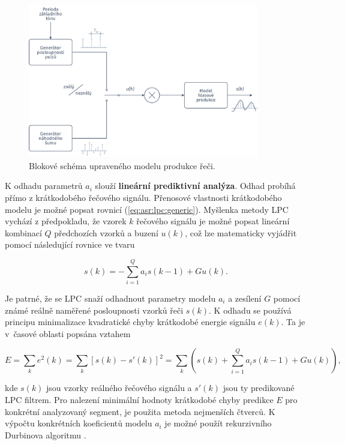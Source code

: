 \begin{figure}[hbpt]
  \centering
  \includegraphics[width=0.9\textwidth]{./ch4-asr/img/speech_process.pdf}
  \caption{Blokové schéma upraveného modelu produkce řeči.}
  \label{fig:asr:model:speech:excitation}
\end{figure}

K odhadu parametrů $a_i$ slouží \textbf{lineární prediktivní analýza}. Odhad probíhá přímo z krátkodobého řečového signálu. Přenosové vlastnosti krátkodobého modelu je možné popsat rovnicí (\ref{eq:asr:lpc:generic}). Myšlenka metody LPC vychází z předpokladu, že vzorek $k$ řečového signálu je možné popsat lineární kombinací $Q$ předchozích vzorků a buzení $u(k)$, což lze matematicky vyjádřit pomocí následující rovnice ve tvaru

\begin{equation}
  s(k) = - \sum_{i = 1}^{Q} a_i s(k-1) + Gu(k).
  \label{eq:asr:lpc:generic:edited}
\end{equation}

\noindent %
Je patrné, že se LPC snaží odhadnout parametry modelu $a_i$ a zesílení $G$ pomocí známé reálně naměřené posloupnosti vzorků řeči $s(k)$. K odhadu se používá principu minimalizace kvadratické chyby krátkodobé energie signálu $e\left(k\right)$. Ta je v~časové oblasti popsána vztahem

\begin{equation}
  E = \sum_{k} e^2(k) = \sum_{k} \left[ s(k) - s'(k)\right]^2 = \sum_{k} \left( s(k) + \sum_{i = 1}^{Q} a_i s(k-1) + Gu(k) \right),
\end{equation}

\noindent kde $s(k)$ jsou vzorky reálného řečového signálu a $s'(k)$ jsou ty predikované LPC filtrem. Pro nalezení minimální hodnoty krátkodobé chyby predikce $E$ pro konkrétní analyzovaný segment, je použita metoda nejmenších čtverců. K výpočtu konkrétních koeficientů modelu $a_i$ je možné použít rekurzivního Durbinova algoritmu \cite{Holmes2001}.

